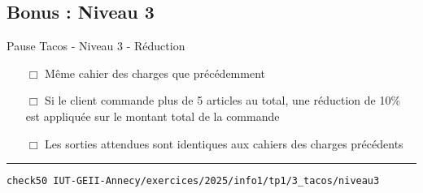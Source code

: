 \subsection{Bonus : Niveau 3}

\begin{UPSTIcahierDesCharges}{Pause Tacos - Niveau 3 - Réduction}
	\begin{itemize}
		\item[$\Box$] Même cahier des charges que précédemment
		\item[$\Box$] Si le client commande plus de 5 articles au total, une réduction de 10\% est appliquée sur le montant total de la commande
		\item[$\Box$] Les sorties attendues sont identiques aux cahiers des charges précédents
	\end{itemize}
	\hrule
	\begin{lstlisting}[language=bash,style=console]
check50 IUT-GEII-Annecy/exercices/2025/info1/tp1/3_tacos/niveau3
\end{lstlisting}
\end{UPSTIcahierDesCharges}